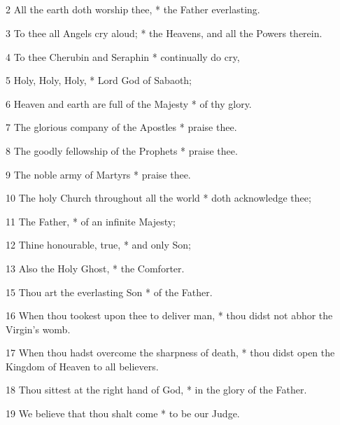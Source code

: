 

\subsection{}

2 All the earth doth worship thee, * the Father everlasting.

3 To thee all Angels cry aloud; * the Heavens, and all the Powers therein.

4 To thee Cherubin and Seraphin * continually do cry,

5 Holy, Holy, Holy, * Lord God of Sabaoth;

6 Heaven and earth are full of the Majesty * of thy glory.

7 The glorious company of the Apostles * praise thee.

8 The goodly fellowship of the Prophets * praise thee.

9 The noble army of Martyrs * praise thee.

10 The holy Church throughout all the world * doth acknowledge thee;

11 The Father, * of an infinite Majesty;

12 Thine honourable, true, * and only Son;

13 Also the Holy Ghost, * the Comforter.



15 Thou art the everlasting Son * of the Father.

16 When thou tookest upon thee to deliver man, * thou didst not abhor the Virgin's womb.

17 When thou hadst overcome the sharpness of death, * thou didst open the Kingdom of Heaven to all believers.

18 Thou sittest at the right hand of God, * in the glory of the Father.

19 We believe that thou shalt come * to be our Judge.

